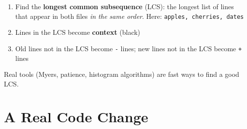 \documentclass[aspectratio=169,10pt,compress]{beamer}
\begin{document}
\begin{frame}[t,fragile]
\begin{center}
\begin{tikzpicture}[]
\end{tikzpicture}
\end{center}
\vspace{-0.6em}
\begin{enumerate}\small
  \item Find the \textbf{longest common subsequence} (LCS): the longest list of lines that
        appear in both files \emph{in the same order}. Here: \texttt{apples, cherries, dates}
  \item Lines in the LCS become \textbf{context} (black)
  \item Old lines not in the LCS become \textcolor{oldred}{\texttt{-} lines};
        new lines not in the LCS become \textcolor{newblue}{\texttt{+} lines}
\end{enumerate}
\small Real tools (Myers, patience, histogram algorithms) are fast ways to find a good LCS.
\end{frame}

\section[Code]{A Real Code Change}
\end{document}
